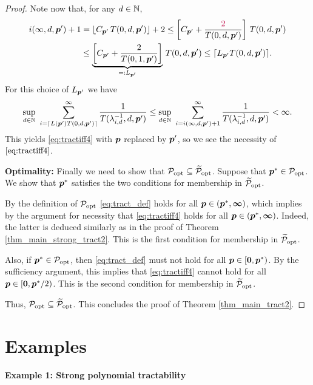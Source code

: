 \documentclass[11pt,a4paper]{article}
\newcommand{\peter}[1]{\begingroup\color{purple}#1\endgroup}
\begin{document}
\begin{proof}
Note now that, for any $d\in\mathbb{N}$,
\begin{align*}
 i(\infty,d,\vp') +1  & = \lfloor C_{\vp'}\, T(0,d,\vp')\rfloor +2 \le  \left[C_{\vp'} + \frac{\peter{2}}{T(0,d,\vp')}   \right]\, T(0,d,\vp')\\
 & \le  \underbrace{\left[C_{\vp'} + \frac{2}{T(0,1,\vp')}   \right]}_{=:L_{\vp'}}\, T(0,d,\vp')
 \le \lceil L_{\vp'} T(0,d,\vp')\rceil .
\end{align*}
For this choice of $L_{\boldsymbol{p}'}$ we have
\[
\sup_{d\in\mathbb{N}}\,\, \sum_{i=\lceil L(\boldsymbol{p}') T(0,d,\boldsymbol{p}')\rceil}^\infty \frac{1}{T(\lambda_{i,d}^{-1},d, \boldsymbol{p}')}
\le
\sup_{d\in\mathbb{N}} \, \, \sum_{i=i (\infty,d,\boldsymbol{p}')+1}^\infty \frac{1}{T (\lambda_{i,d}^{-1},d,\boldsymbol{p}')} <
\infty.
\]
This yields \eqref{eq:tractiff4} with $\boldsymbol{p}$ replaced by $\boldsymbol{p}'$, so we see the necessity of $\eqref{eq:tractiff4}$.

\bigskip

\noindent \textbf{Optimality:}
Finally we need to show that $\mathcal{P}_{\textup{opt}} \subseteq \widetilde{\mathcal{P}}_{\textup{opt}}$.  Suppose that  $\boldsymbol{p}^* \in \mathcal{P}_{\textup{opt}}$.  We show that $\boldsymbol{p}^*$ satisfies the two conditions for membership in $\widetilde{\mathcal{P}}_{\textup{opt}}$.

By the definition of  $\mathcal{P}_{\textup{opt}}$ \eqref{eq:tract_def}  holds for all $\boldsymbol{p} \in (\boldsymbol{p}^*,\boldsymbol{\infty})$, which implies by the argument for necessity that  \eqref{eq:tractiff4} holds for all $\boldsymbol{p} \in (\boldsymbol{p}^*,\boldsymbol{\infty})$.  \peter{Indeed, the latter is deduced similarly as in the proof of Theorem \ref{thm_main_strong_tract2}.}
This is the first condition for membership in $\widetilde{\mathcal{P}}_{\textup{opt}}$.

Also, if  $\boldsymbol{p}^* \in \mathcal{P}_{\textup{opt}}$, then \eqref{eq:tract_def} must not hold for all $\boldsymbol{p} \in [\boldsymbol{0}, \boldsymbol{p}^*)$.  By the sufficiency argument, this implies that \eqref{eq:tractiff4} cannot hold for all $\boldsymbol{p} \in [\boldsymbol{0},\boldsymbol{p}^*/2)$.  This is the second condition for membership in $\widetilde{\mathcal{P}}_{\textup{opt}}$.

Thus,  $\mathcal{P}_{\textup{opt}} \subseteq \widetilde{\mathcal{P}}_{\textup{opt}}$.  This concludes the proof of Theorem \ref{thm_main_tract2}.

\end{proof}


\section{Examples} \label{sec:examples}

\paragraph{Example 1: Strong polynomial tractability}
\end{document}
